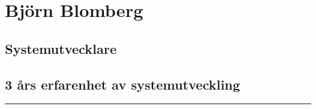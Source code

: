 \documentclass{article}
\begin{document}
\begin{minipage}[t]{0.7\textwidth}
\titleformat{\section}{\Huge\bfseries}{\thesection}{1em}{}
\section*{\textcolor{colorBlue}{Björn Blomberg}}
\subsection*{\textcolor{colorTitelErfarenhet}{Systemutvecklare}}
\subsection*{3 års erfarenhet av systemutveckling}
\rule{10cm}{0.4pt}
\titleformat{\section}{\Large\bfseries}{\thesection}{1em}{}
\vspace{1.5cm}
\end{minipage}%
\begin{minipage}[t]{0.3\textwidth}
\vspace{-10pt} %
\end{minipage}%
\end{document}
